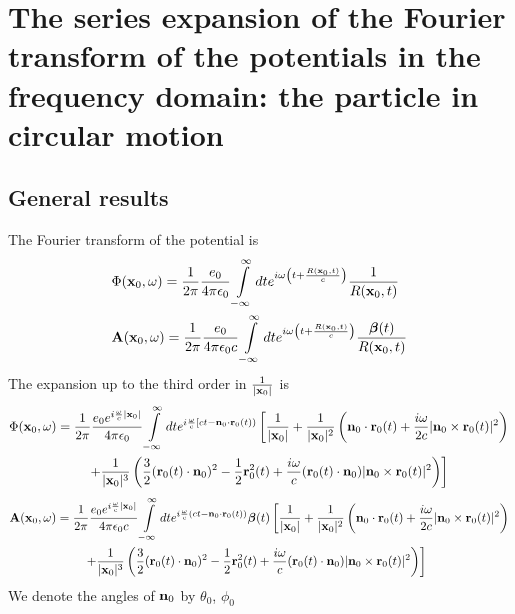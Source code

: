 \chapter{The series expansion of the Fourier transform of the potentials in the frequency domain: the particle in circular motion}

\section{General results}
The Fourier transform of the potential is
\begin{align}
     & \Phi({\bf x}_0,\omega)=\frac1{2\pi}\frac{e_0}{4\pi\epsilon_0}\int\limits_{-\infty}^{\infty}dte^{i\omega\left(t+\frac{R({\bf x}_0,t)}c\right)}\frac1{R({\bf x}_0,t)}                             \\
     & {\bf A}({\bf x}_0,\omega)=\frac1{2\pi}\frac{e_0}{4\pi\epsilon_0c}\int\limits_{-\infty}^{\infty}dte^{i\omega\left(t+\frac{R({\bf x}_0,t)}c\right)}\frac{{\boldsymbol{\beta}}(t)}{R({\bf x}_0,t)}
\end{align}
The expansion up to the third order in $\frac1{|{\bf x}_0|}$ is
\begin{align}
     & \Phi({\bf x}_0,\omega)=\frac1{2\pi}\frac{e_0 e^{i\frac{\omega}c|{\bf x}_0|}}{4\pi\epsilon_0}\int\limits_{-\infty}^{\infty}dte^{i\frac{\omega}c\left[ct-{\bf n}_0\cdot{\bf r}_0(t)\right)}                                     \left[\frac1{|{\bf x}_0|} +\frac1{|{\bf x}_0|^2}\left({{\bf n}_0\cdot{\bf r}_0(t)}+\frac{i\omega}{2c}{|{\bf n}_0\times{\bf r}_0(t)|^2} \right)       \right.\nonumber \\
     & \qquad \qquad \qquad \left.+\frac1{|{\bf x}_0|^3}\left(\frac32({\bf r}_0(t)
    \cdot{\bf n}_0)^2-\frac12{\bf r}^2_0(t)+\frac{i\omega}c({\bf r}_0(t)
    \cdot{\bf n}_0) |{\bf n}_0\times{\bf r}_0(t)|^2\right)     \right]\end{align}
\begin{align}
     & {\bf A}({\bf x}_0,\omega)=\frac1{2\pi}\frac{e_0 e^{i\frac{\omega}c|{\bf x}_0|}}{4\pi\epsilon_0 c}\int\limits_{-\infty}^{\infty}dte^{i\frac{\omega}c\left(ct-{\bf n}_0\cdot{\bf r}_0(t)\right)} {\boldsymbol{\beta}}(t) \left[\frac1{|{\bf x}_0|} +\frac1{|{\bf x}_0|^2}\left({{\bf n}_0\cdot{\bf r}_0(t)}+\frac{i\omega}{2c}{|{\bf n}_0\times{\bf r}_0(t)|^2} \right)       \right.\nonumber \\
     & \qquad \qquad \qquad \left.+\frac1{|{\bf x}_0|^3}\left(\frac32({\bf r}_0(t)
    \cdot{\bf n}_0)^2-\frac12{\bf r}^2_0(t)+\frac{i\omega}c({\bf r}_0(t)
    \cdot{\bf n}_0) |{\bf n}_0\times{\bf r}_0(t)|^2\right)     \right]
\end{align}
We denote the angles of ${\bf n}_0$ by $\theta_0$, $\phi_0$

